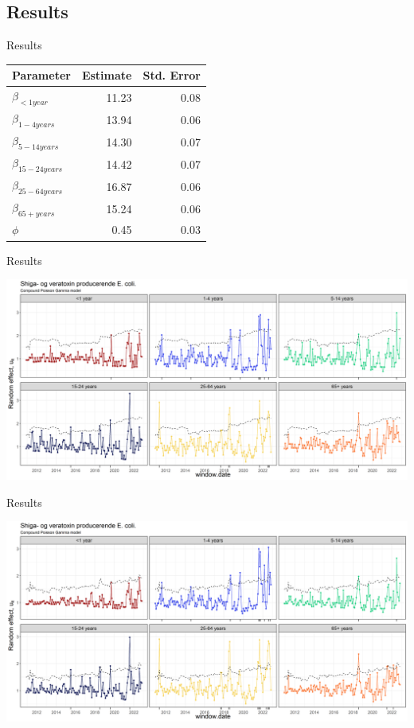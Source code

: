 \documentclass[aspectratio=169]{beamer}
\begin{document}
\hypertarget{results-3}{%
\subsection{Results}\label{results-3}}

\begin{frame}{Results}
\tiny

\begin{table}
\centering\begingroup\fontsize{10}{12}\selectfont

\begin{tabular}{lrr}
\toprule
Parameter & Estimate & Std. Error\\
\midrule
$\beta_{<1 year}$ & 11.23 & 0.08\\
$\beta_{1-4 years}$ & 13.94 & 0.06\\
$\beta_{5-14 years}$ & 14.30 & 0.07\\
$\beta_{15-24 years}$ & 14.42 & 0.07\\
$\beta_{25-64 years}$ & 16.87 & 0.06\\
$\beta_{65+ years}$ & 15.24 & 0.06\\
$\phi$ & 0.45 & 0.03\\
\bottomrule
\end{tabular}
\endgroup{}
\end{table}

\normalsize
\end{frame}

\begin{frame}{Results}
\protect\hypertarget{results-4}{}
\tiny

\includegraphics[width=1\linewidth]{../figures/windowedSTECPoisG}

\normalsize
\end{frame}

\begin{frame}{Results}
\protect\hypertarget{results-5}{}
\tiny

\includegraphics[width=1\linewidth]{../figures/windowedSTECPoisGExclude}

\normalsize
\end{frame}
\end{document}
